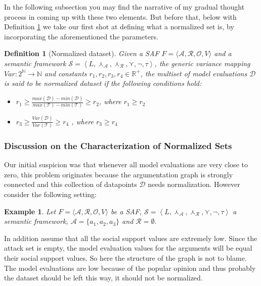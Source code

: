 \documentclass{article}
\newtheorem{definition}{Definition}
\newtheorem{example}{Example}
\newcommand{\nat}{\mathbb{N}}   %
\newcommand{\real}{\mathbb{R}}  %
\newcommand{\args}{\mathcal{A}} %
\newcommand{\att}{\mathcal{R}}  %
\newcommand{\valueset}{L}
\newcommand{\obj}{\mathcal{O}} %
\newcommand{\safid}{F}               %
\newcommand{\safbodyO}{\langle \args, \att, \obj, V \rangle} %
\newcommand{\safO}{\safid = \safbodyO} %
\newcommand{\sembodyNew}{\left\langle \valueset,\SAFand_\mathcal{A}, \SAFand_\mathcal{R},\SAFor,\lnot,\tau \right\rangle} %
\newcommand{\SAFand}{\curlywedge}     %
\newcommand{\SAFor}{\curlyvee}        %
\newcommand{\sem}{\mathcal{S}}
\newcommand{\dataset}{\mathcal{D}}   %
\newcommand{\ssset}{\mathcal{T}}   %
\begin{document}
In the following subsection you may find the narrative of my gradual thought process in coming up with these two elements. But before that, below with Definition \ref{def:normSet} we take our first shot at defining what a normalized set is, by incorporating the aforementioned the parameters.


\begin{definition} [Normalized dataset]
\label{def:normSet}  
Given a SAF $\safO$ and a semantic framework $\sem = \sembodyNew$, the generic variance mapping $Var: 2^{\nat} \rightarrow \nat$ and constants $r_1,  r_2, r_3, r_4 \in \real^+$, the multiset of model evaluations $\dataset$ is said to be normalized dataset if the following conditions hold:
\begin{itemize}
\item $r_1 \geq \frac{max(\dataset) - min(\dataset)}{max(\ssset) - min(\ssset)} \geq r_2$, where $r_1  \geq r_2$
\item $r_3 \geq \frac{Var(\dataset)}{Var(\ssset)} \geq r_4$ , where $r_3  \geq r_4$
\end{itemize}
\end{definition}

\begin{comment}
\begin{example}
Let $\safO$ be a SAF, $\sem = \sembodyNew$ a semantic framework, $\args =\{a_1, a_2, a_3\}$ and $\att =\{\}.$
\end{example}
\end{comment}

\subsubsection{Discussion on the Characterization of Normalized Sets}

Our initial suspicion was that whenever all model evaluations are very close to zero, this problem originates because the argumentation graph is strongly connected and this collection of datapoints $\dataset$ needs normalization. However consider the following setting:

\begin{example}
Let $\safO$ be a SAF, $\sem = \sembodyNew$ a semantic framework, $\args =\{a_1, a_2, a_3\}$ and $\att = \emptyset.$
\end{example}

In addition assume that all the social support values are extremely low. Since the attack set is empty, the model evaluation values for the arguments will be equal their social support values. So here the structure of the graph is not to blame. The model evaluations are low because of the popular opinion and thus probably the dataset should be left this way, it should not be normalized.
 
\end{document}

